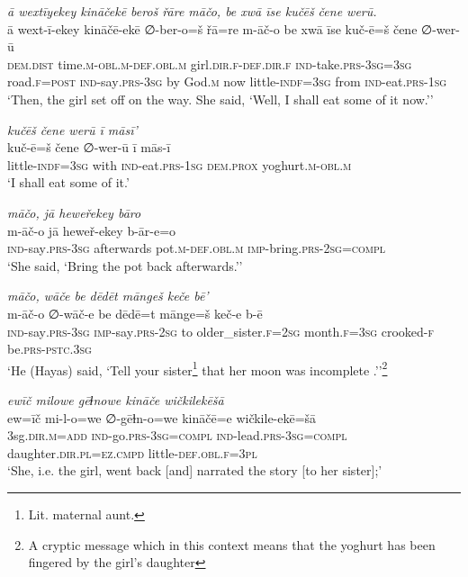 \ea \label{ŽH.41}
\textit{ā wextīyekey kināčekē beroš řāre māčo, be xwā īse kučēš čene werū.} \\ 
\gll ā wext-ī-ekey kināčē-ekē ∅-ber-o=š řā=re m-āč-o be xwā īse kuč-ē=š čene ∅-wer-ū \\ 
 \textsc{dem.dist} time\textsc{.m}\textsc{-obl}\textsc{.m}\textsc{-def}\textsc{.obl}\textsc{.m} girl\textsc{.dir}\textsc{\textsc{.f}}\textsc{-def}\textsc{.dir}\textsc{\textsc{.f}} \textsc{ind-}take\textsc{.prs}\textsc{-3sg}\textsc{=3sg} road\textsc{\textsc{.f}}\textsc{=\textsc{post}} \textsc{ind-}say\textsc{.prs}\textsc{-3sg} by God\textsc{.m} now little\textsc{-indf}\textsc{=3sg} from \textsc{ind-}eat\textsc{.prs}\textsc{-1sg} \\ 
\glt `Then, the girl set off on the way. She said, ‘Well, I shall eat some of it now.’'
\z 
 
\ea \label{ŽH.42}
\textit{kučēš čene werū ī māsī’} \\ 
\gll kuč-ē=š čene ∅-wer-ū ī mās-ī \\ 
 little\textsc{-indf}\textsc{=3sg} with \textsc{ind-}eat\textsc{.prs}\textsc{-1sg} \textsc{dem.prox} yoghurt\textsc{.m}\textsc{-obl}\textsc{.m} \\ 
\glt `I shall eat some of it.'
\z 
 
\ea \label{ŽH.44}
\textit{māčo, jā heweřekey bāro} \\ 
\gll m-āč-o jā heweř-ekey b-ār-e=o \\ 
 \textsc{ind-}say\textsc{.prs}\textsc{-3sg} afterwards pot\textsc{.m}\textsc{-def}\textsc{.obl}\textsc{.m} \textsc{imp-}bring\textsc{.prs}-\textsc{2sg}\textsc{=compl} \\ 
\glt `She said, ‘Bring the pot back afterwards.’'
\z 
 
\ea \label{ŽH.45}
\textit{māčo, wāče be dēdēt māngeš keče bē’} \\ 
\gll m-āč-o ∅-wāč-e be dēdē=t mānge=š keč-e b-ē \\ 
 \textsc{ind-}say\textsc{.prs}\textsc{-3sg} \textsc{imp-}say\textsc{.prs-}\textsc{2sg} to older\_sister\textsc{\textsc{.f}}\textsc{=\textsc{2sg}} month\textsc{\textsc{.f}}\textsc{=3sg} crooked\textsc{-f} be\textsc{.prs}\textsc{-pstc}\textsc{.3sg} \\ 
\glt `He (Hayas) said, ‘Tell your sister\footnote{Lit. maternal aunt.} that her moon was incomplete .’'\footnote{A cryptic message which in this context means that the yoghurt has been fingered by the girl’s daughter}
\z 
 
\ea \label{ŽH.46}
\textit{ewīč milowe gēɫnowe kināče wičkilekēšā} \\ 
\gll ew=īč mi-l-o=we ∅-gēɫn-o=we kināčē=e wičkile-ekē=šā \\ 
 3sg\textsc{.dir}\textsc{.m}\textsc{=add} \textsc{ind-}go\textsc{.prs}\textsc{-3sg}\textsc{=compl} \textsc{ind-}lead\textsc{.prs}\textsc{-3sg}\textsc{=compl} daughter\textsc{.dir}\textsc{.pl}\textsc{=ez}\textsc{.cmpd} little\textsc{-def}\textsc{.obl}\textsc{\textsc{.f}}\textsc{=3pl} \\ 
\glt `She, i.e. the girl, went back [and] narrated the story [to her sister];'
\z 
 
